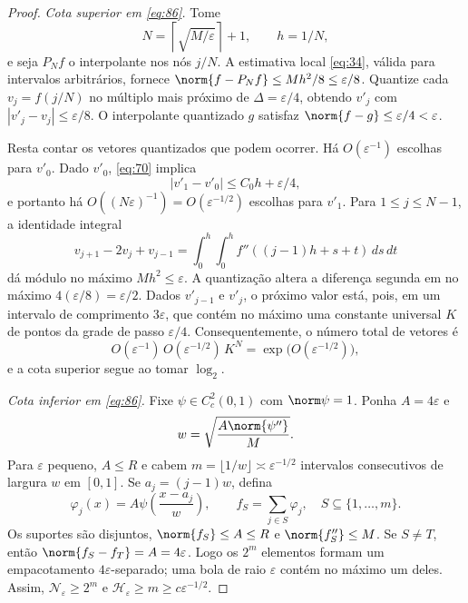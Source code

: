 \begin{proof}
\emph{Cota superior em \eqref{eq:86}.} Tome
\[
N=\left\lceil\sqrt{M/\varepsilon}\right\rceil+1,\qquad h=1/N,
\]
e seja $P_Nf$ o interpolante nos nós $j/N$. A estimativa local \eqref{eq:34}, válida para intervalos arbitrários, fornece $\norm{f-P_Nf}\le Mh^2/8\le\varepsilon/8$. Quantize cada $v_j=f(j/N)$ no múltiplo mais próximo de $\Delta=\varepsilon/4$, obtendo $v'_j$ com $|v'_j-v_j|\le\varepsilon/8$. O interpolante quantizado $g$ satisfaz $\norm{f-g}\le\varepsilon/4<\varepsilon$.

Resta contar os vetores quantizados que podem ocorrer. Há $O(\varepsilon^{-1})$ escolhas para $v'_0$. Dado $v'_0$, \eqref{eq:70} implica
\[
|v'_1-v'_0|\le C_0h+\varepsilon/4,
\]
e portanto há $O((N\varepsilon)^{-1})=O(\varepsilon^{-1/2})$ escolhas para $v'_1$. Para $1\le j\le N-1$, a identidade integral
\[
v_{j+1}-2v_j+v_{j-1}=\int_0^h\int_0^h
f''((j-1)h+s+t)\,ds\,dt
\]
dá módulo no máximo $Mh^2\le\varepsilon$. A quantização altera a diferença segunda em no máximo $4(\varepsilon/8)=\varepsilon/2$. Dados $v'_{j-1}$ e $v'_j$, o próximo valor está, pois, em um intervalo de comprimento $3\varepsilon$, que contém no máximo uma constante universal $K$ de pontos da grade de passo $\varepsilon/4$. Consequentemente, o número total de vetores é
\[
O(\varepsilon^{-1})\,O(\varepsilon^{-1/2})\,K^N
=\exp\bigl(O(\varepsilon^{-1/2})\bigr),
\]
e a cota superior segue ao tomar $\log_2$.

\emph{Cota inferior em \eqref{eq:86}.} Fixe $\psi\in C_c^2(0,1)$ com $\norm\psi=1$. Ponha $A=4\varepsilon$ e
\[
w=\sqrt{\frac{A\norm{\psi''}}M}.
\]
Para $\varepsilon$ pequeno, $A\le R$ e cabem $m=\lfloor1/w\rfloor\asymp\varepsilon^{-1/2}$ intervalos consecutivos de largura $w$ em $[0,1]$. Se $a_j=(j-1)w$, defina
\[
\varphi_j(x)=A\psi\left(\frac{x-a_j}w\right),\qquad
f_S=\sum_{j\in S}\varphi_j,\quad S\subseteq\{1,\ldots,m\}.
\]
Os suportes são disjuntos, $\norm{f_S}\le A\le R$ e $\norm{f_S''}\le M$. Se $S\ne T$, então $\norm{f_S-f_T}=A=4\varepsilon$. Logo os $2^m$ elementos formam um empacotamento $4\varepsilon$-separado; uma bola de raio $\varepsilon$ contém no máximo um deles. Assim, $\mathcal N_\varepsilon\ge2^m$ e $\mathcal H_\varepsilon\ge m\ge c\varepsilon^{-1/2}$.


\end{proof}
